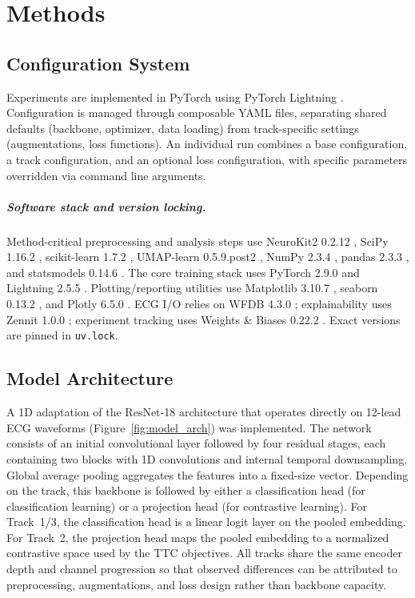 \chapter{Methods}
\label{ch:methods}

\section{Configuration System}
Experiments are implemented in PyTorch \parencite{pytorch_2019} using PyTorch Lightning \parencite{pytorch_lightning_2025}.
Configuration is managed through composable YAML files, separating shared defaults (backbone, optimizer, data loading) from track-specific settings (augmentations, loss functions).
An individual run combines a base configuration, a track configuration, and an optional loss configuration, with specific parameters overridden via command line arguments.

\paragraph{Software stack and version locking.}
Method-critical preprocessing and analysis steps use NeuroKit2 0.2.12 \parencite{neurokit2_software}, SciPy 1.16.2 \parencite{scipy_software}, scikit-learn 1.7.2 \parencite{scikit_learn_software}, UMAP-learn 0.5.9.post2 \parencite{umap_learn_software}, NumPy 2.3.4 \parencite{numpy_software}, pandas 2.3.3 \parencite{pandas_software}, and statsmodels 0.14.6 \parencite{statsmodels_software}.
The core training stack uses PyTorch 2.9.0 \parencite{pytorch_2019} and Lightning 2.5.5 \parencite{pytorch_lightning_2025}.
Plotting/reporting utilities use Matplotlib 3.10.7 \parencite{matplotlib_software}, seaborn 0.13.2 \parencite{seaborn_software}, and Plotly 6.5.0 \parencite{plotly_software}.
ECG I/O relies on WFDB 4.3.0 \parencite{wfdb_software}; explainability uses Zennit 1.0.0 \parencite{zennit_software}; experiment tracking uses Weights \& Biases 0.22.2 \parencite{wandb_software}.
Exact versions are pinned in \texttt{uv.lock}.

\section{Model Architecture}
A 1D adaptation of the ResNet-18 architecture \parencite{resnet_2015} that operates directly on 12-lead ECG waveforms (Figure~\ref{fig:model_arch}) was implemented.
The network consists of an initial convolutional layer followed by four residual stages, each containing two blocks with 1D convolutions and internal temporal downsampling.
Global average pooling aggregates the features into a fixed-size vector.
Depending on the track, this backbone is followed by either a classification head (for classification learning) or a projection head (for contrastive learning).
For Track~1/3, the classification head is a linear logit layer on the pooled embedding.
For Track~2, the projection head maps the pooled embedding to a normalized contrastive space used by the TTC objectives.
All tracks share the same encoder depth and channel progression so that observed differences can be attributed to preprocessing, augmentations, and loss design rather than backbone capacity.


